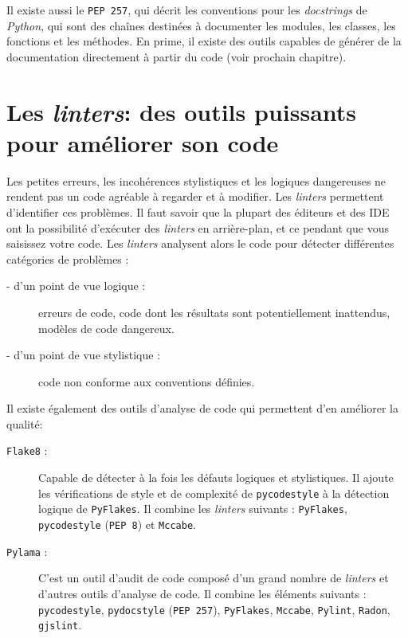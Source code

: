 \documentclass[a4paper,12pt]{book}
\begin{document}
Il existe aussi le \texttt{PEP 257}, qui décrit les conventions pour les \textit{docstrings} de \textit{Python}, qui sont des chaînes destinées à documenter les modules, les classes, les fonctions et les méthodes. En prime, il existe des outils capables de générer de la documentation directement à partir du code (voir prochain chapitre).
\medskip

\section{Les \textit{linters}: des outils puissants pour améliorer son code}
Les petites erreurs, les incohérences stylistiques et les logiques dangereuses ne rendent pas un code agréable à regarder et à modifier. Les \textit{linters} permettent d'identifier ces problèmes. Il faut savoir que la plupart des éditeurs et des IDE ont la possibilité d'exécuter des \textit{linters} en arrière-plan, et ce  pendant que vous saisissez votre code. Les \textit{linters} analysent alors le code pour détecter différentes catégories de problèmes :
\begin{description}
	\item[- d'un point de vue logique :] erreurs de code, code dont les résultats sont potentiellement inattendus, modèles de code dangereux.
	\item[- d'un point de vue stylistique :] code non conforme aux conventions définies.
\end{description}
\medskip

Il existe également des outils d'analyse de code qui permettent d’en améliorer la qualité:
\begin{description}
	\item[\texttt{Flake8} :] Capable de détecter à la fois les défauts logiques et stylistiques. Il ajoute les vérifications de style et de complexité de \texttt{pycodestyle} à la détection logique de \texttt{PyFlakes}. Il combine les \textit{linters} suivants : \texttt{PyFlakes}, \texttt{pycodestyle} (\texttt{PEP 8}) et \texttt{Mccabe}.
	\item[\texttt{Pylama} :] C'est un outil d'audit de code composé d'un grand nombre de \textit{linters} et d'autres outils d'analyse de code. Il combine les éléments suivants : \texttt{pycodestyle}, \texttt{pydocstyle} (\texttt{PEP 257}), \texttt{PyFlakes}, \texttt{Mccabe}, \texttt{Pylint}, \texttt{Radon}, \texttt{gjslint}.
\end{description}
\medskip
\end{document}
